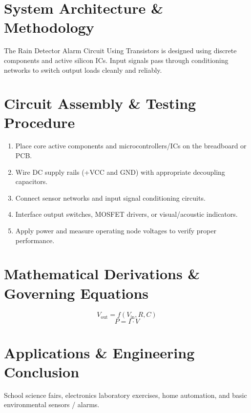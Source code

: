 \documentclass[11pt,a4paper]{article}
\begin{document}
\section{System Architecture \& Methodology}
The Rain Detector Alarm Circuit Using Transistors is designed using discrete components and active silicon ICs. Input signals pass through conditioning networks to switch output loads cleanly and reliably.

\section{Circuit Assembly \& Testing Procedure}
\begin{enumerate}
    \item Place core active components and microcontrollers/ICs on the breadboard or PCB.
    \item Wire DC supply rails (+VCC and GND) with appropriate decoupling capacitors.
    \item Connect sensor networks and input signal conditioning circuits.
    \item Interface output switches, MOSFET drivers, or visual/acoustic indicators.
    \item Apply power and measure operating node voltages to verify proper performance.
\end{enumerate}

\section{Mathematical Derivations \& Governing Equations}
\begin{equation}
V_{\text{out}} = f(V_{\text{in}}, R, C)
\end{equation}
\begin{equation}
P = I \cdot V
\end{equation}

\section{Applications \& Engineering Conclusion}
School science fairs, electronics laboratory exercises, home automation, and basic environmental sensors / alarms.
\end{document}
